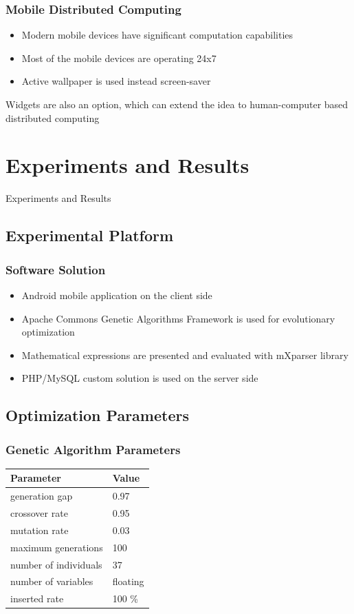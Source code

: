 \documentclass{beamer}
\begin{document}
\begin{frame}
\frametitle{Mobile Distributed Computing}
\begin{itemize}
	\item Modern mobile devices have significant computation capabilities
	\item Most of the mobile devices are operating 24x7
	\item Active wallpaper is used instead screen-saver
\end{itemize}
Widgets are also an option, which can extend the idea to human-computer based distributed computing
\end{frame}

\section{Experiments and Results}

\begin{frame}
\center \huge{Experiments and Results}
\end{frame}

\subsection{Experimental Platform}

\begin{frame}
\frametitle{Software Solution}
\begin{itemize}
	\item Android mobile application on the client side
	\item Apache Commons Genetic Algorithms Framework is used for evolutionary optimization
	\item Mathematical expressions are presented and evaluated with mXparser library
	\item PHP/MySQL custom solution is used on the server side
\end{itemize}
\end{frame}

\subsection{Optimization Parameters}

\begin{frame}
\frametitle{Genetic Algorithm Parameters}
\begin{table}
	\begin{tabular}{p{5.4cm}p{4.4cm}}
		\hline
		\textbf{Parameter} & \textbf{Value} \\
		\hline
		generation gap & 0.97 \\
		crossover rate & 0.95 \\
		mutation rate & 0.03 \\
		maximum generations & 100 \\
		number of individuals & 37 \\
		number of variables & floating \\
		inserted rate & 100 \% \\
		\hline
	\end{tabular}
\end{table}
\end{frame}
\end{document}
